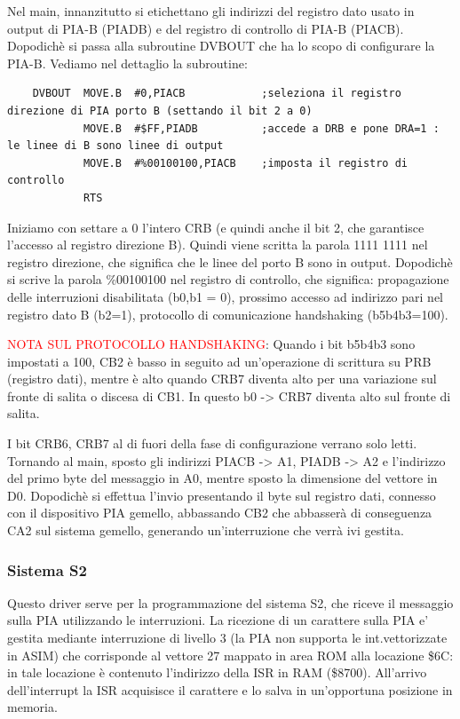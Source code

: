 Nel main, innanzitutto si etichettano gli indirizzi del registro dato usato in output di PIA-B (PIADB) e del registro di controllo di PIA-B (PIACB). Dopodichè si passa alla subroutine DVBOUT che ha lo scopo di configurare la PIA-B. Vediamo nel dettaglio la subroutine:

\begin{lstlisting}
    DVBOUT	MOVE.B	#0,PIACB		    ;seleziona il registro direzione di PIA porto B (settando il bit 2 a 0)
	        MOVE.B	#$FF,PIADB	  		;accede a DRB e pone DRA=1 : le linee di B sono linee di output	
	        MOVE.B	#%00100100,PIACB   	;imposta il registro di controllo	
	        RTS
\end{lstlisting}

Iniziamo con settare a 0 l'intero CRB (e quindi anche il bit 2, che garantisce l'accesso al registro direzione B). Quindi viene scritta la parola 1111 1111 nel registro direzione, che significa che le linee del porto B sono in output. Dopodichè si scrive la parola  \%00100100 nel registro di controllo, che significa: propagazione delle interruzioni disabilitata (b0,b1 = 0), prossimo accesso ad indirizzo pari nel registro dato B (b2=1), protocollo di comunicazione handshaking (b5b4b3=100).

\textcolor{red}{NOTA SUL PROTOCOLLO HANDSHAKING}: 
Quando i bit b5b4b3 sono impostati a 100, CB2 è basso in seguito ad un'operazione di scrittura su PRB (registro dati), mentre è alto quando CRB7 diventa alto per una variazione sul fronte di salita o discesa di CB1. In questo b0 -> CRB7 diventa alto sul fronte di salita. 

I bit CRB6, CRB7 al di fuori della fase di configurazione verrano solo letti. Tornando al main, sposto gli indirizzi PIACB -> A1, PIADB -> A2 e l'indirizzo del primo byte del messaggio in A0, mentre sposto la dimensione del vettore in D0.   
Dopodichè si effettua l'invio presentando il byte sul registro dati, connesso con il dispositivo PIA gemello, abbassando CB2 che abbasserà di conseguenza CA2 sul sistema gemello, generando un'interruzione che verrà ivi gestita.

\subsubsection{Sistema S2}
Questo driver serve per la programmazione del sistema S2, che riceve il messaggio sulla PIA utilizzando le interruzioni. La ricezione di un carattere sulla PIA e' gestita mediante interruzione di livello 3 (la PIA non supporta le int.vettorizzate in ASIM)
che corrisponde al vettore 27 mappato in area ROM alla locazione \$6C: in tale locazione è contenuto l'indirizzo della ISR in RAM (\$8700). 
All'arrivo dell'interrupt la ISR acquisisce il carattere e lo salva in un'opportuna posizione in memoria.

